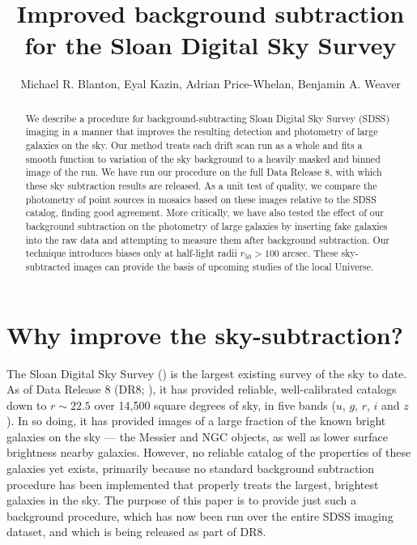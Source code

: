 \documentclass[10pt,preprint]{aastex}
\newcounter{address}
\begin{document}
\title{Improved background subtraction for the Sloan Digital Sky Survey}


\author{
Michael R. Blanton\altaffilmark{\ref{NYU}},
Eyal Kazin\altaffilmark{\ref{NYU}},
Adrian Price-Whelan\altaffilmark{\ref{NYU}}, 
Benjamin A. Weaver\altaffilmark{\ref{NYU}}
}

\setcounter{address}{1}

\begin{abstract}
We describe a procedure for background-subtracting Sloan Digital Sky
Survey (SDSS) imaging in a manner that improves the resulting
detection and photometry of large galaxies on the sky. Our method
treats each drift scan run as a whole and fits a smooth function to
variation of the sky background to a heavily masked and binned image
of the run. We have run our procedure on the full Data Release 8, with
which these sky subtraction results are released.  As a unit test of
quality, we compare the photometry of point sources in mosaics based
on these images relative to the SDSS catalog, finding good
agreement. More critically, we have also tested the effect of our
background subtraction on the photometry of large galaxies by
inserting fake galaxies into the raw data and attempting to measure
them after background subtraction.  Our technique introduces biases
only at half-light radii $r_{50}>100$ arcsec. These sky-subtracted
images can provide the basis of upcoming studies of the local
Universe.
\end{abstract}


\section{Why improve the sky-subtraction?}
\label{sec:intro}

The Sloan Digital Sky Survey (\citealt{york00a}) is the largest
existing survey of the sky to date. As of Data Release 8 (DR8;
\citealt{agol11a}), it has provided reliable, well-calibrated catalogs
down to $r\sim 22.5$ over 14,500 square degrees of sky, in five bands
($u$, $g$, $r$, $i$ and $z$).  In so doing, it has provided images of
a large fraction of the known bright galaxies on the sky --- the
Messier and NGC objects, as well as lower surface brightness nearby
galaxies. However, no reliable catalog of the properties of these
galaxies yet exists, primarily because no standard background
subtraction procedure has been implemented that properly treats the
largest, brightest galaxies in the sky. The purpose of this paper is
to provide just such a background procedure, which has now been run
over the entire SDSS imaging dataset, and which is being released as
part of DR8.
\end{document}
